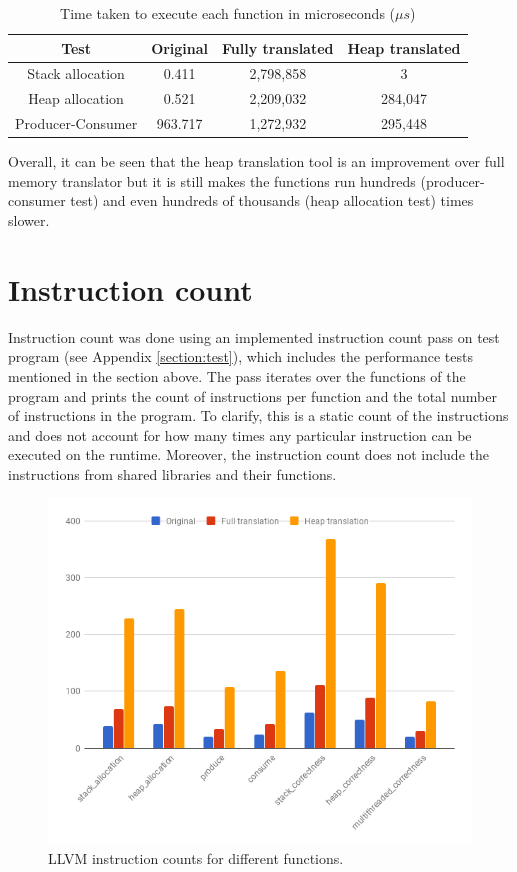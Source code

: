 \documentclass[bsc,frontabs,twoside,singlespacing,parskip,deptreport]{infthesis}     %
\begin{document}
\begin{table}[h]
\centering
\begin{tabular}{ c | c c c }
Test & Original & Fully translated & Heap translated \\
\hline
Stack allocation & 0.411 & 2,798,858 & 3 \\
Heap allocation & 0.521 & 2,209,032 & 284,047 \\
Producer-Consumer & 963.717 & 1,272,932 & 295,448
\end{tabular}
\caption{Time taken to execute each function in microseconds ($\mu s$)}
\label{table:performance}
\end{table}

Overall, it can be seen that the heap translation tool is an improvement over full memory translator but it is still makes the functions run hundreds (producer-consumer test) and even hundreds of thousands (heap allocation test) times slower.

\section{Instruction count}

Instruction count was done using an implemented instruction count pass on test program (see Appendix \ref{section:test}), which includes the performance tests mentioned in the section above. The pass iterates over the functions of the program and prints the count of instructions per function and the total number of instructions in the program. To clarify, this is a static count of the instructions and does not account for how many times any particular instruction can be executed on the runtime. Moreover, the instruction count does not include the instructions from shared libraries and their functions.

\begin{figure}[H]
\centering
\includegraphics[width=1\textwidth]{images/instruction_count}
\caption{LLVM instruction counts for different functions.}
\label{fig:instruction_count}
\end{figure}
\end{document}
